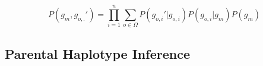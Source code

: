 \documentclass[11pt]{article}
\begin{document}
\begin{equation}
  P(g_m, g_{o,.}') = \prod_{i = 1}^n \sum_{o \in \Omega} P(g_{o,i}' | g_{o,i}) P(g_{o,i} | g_{m}) P(g_m)
\end{equation}

%
%

\subsection{Parental Haplotype Inference}





\end{document}
